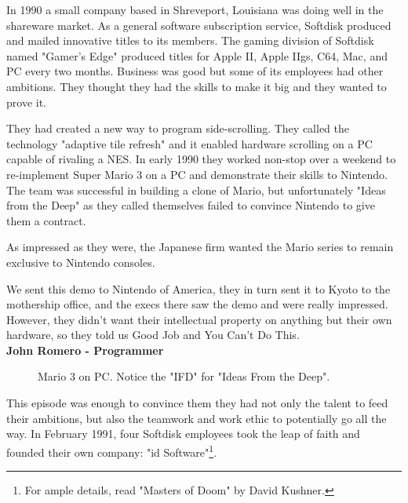 \documentclass[book.tex]{subfiles}
\begin{document}
\label{chapter_team}
In 1990 a small company based in Shreveport, Louisiana was doing well in the shareware market. As a general software subscription service, Softdisk produced and mailed innovative titles to its members. The gaming division of Softdisk named "Gamer's Edge" produced titles for Apple II, Apple IIgs, C64, Mac, and PC every two months. Business was good but some of its employees had other ambitions. They thought they had the skills to make it big and they wanted to prove it.\\
\par
They had created a new way to program side-scrolling. They called the technology "adaptive tile refresh" and it enabled hardware scrolling on a PC capable of rivaling a NES. In early 1990 they worked non-stop over a weekend to re-implement Super Mario 3 on a PC and demonstrate their skills to Nintendo. The team was successful in building a clone of Mario, but unfortunately "Ideas from the Deep" as they called themselves failed to convince Nintendo to give them a contract.\\
\par As impressed as they were, the Japanese firm wanted the Mario series to remain exclusive to Nintendo consoles.\\
\par
\begin{fancyquotes}
We sent this demo to Nintendo of America, they in turn sent it to Kyoto to the mothership office, and the execs there saw the demo and were really impressed. However, they didn't want their intellectual property on anything but their own hardware, so they told us Good Job and You Can't Do This\protect\footnotemark.
 \bigskip \\
\textbf{John Romero - Programmer}
 \end{fancyquotes}
 \begin{figure}[H]
\caption{Mario 3 on PC. Notice the "IFD" for "Ideas From the Deep".}
\end{figure}

\par
This episode was enough to convince them they had not only the talent to feed their ambitions, but also the teamwork and work ethic to potentially go all the way. In February 1991, four Softdisk employees took the leap of faith and founded their own company: "id Software"\footnote{For ample details, read "Masters of Doom" by David Kushner.}.\\ 
\par
 
\end{document}
